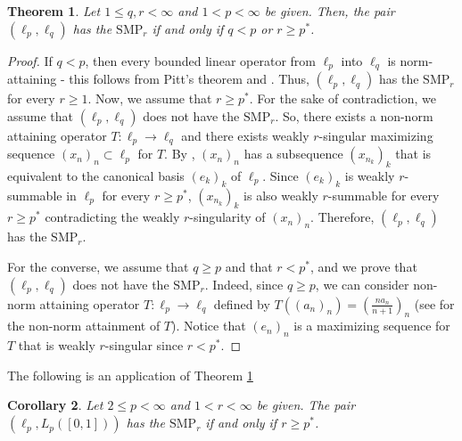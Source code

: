 \documentclass[12 pt]{article}%
\newtheorem{theorem}{Theorem}[section]
\newtheorem{corollary}[theorem]{Corollary}
\newtheorem{final remark}[theorem]{Final Remark}
\begin{document}
\begin{theorem} \label{teoexlp}
    Let $1 \leq q, r < \infty$ and $1 < p < \infty$ be given. Then, the pair $(\ell_p, \ell_q)$ has the $\mathrm{SMP}_r$ if and only if $q< p$ or $r \geq p^*$.
\end{theorem}


\begin{proof}    If $q < p$, then every bounded linear operator from $\ell_p$ into $\ell_q$ is norm-attaining - this follows from Pitt's theorem and \cite[Theorem B]{sheldon}. Thus, $(\ell_p, \ell_q)$ has the $\mathrm{SMP}_r$ for every $r \geq 1$.  
Now, we assume that $r \geq p^*$. For the sake of contradiction, we assume that $(\ell_p, \ell_q)$ does not have the $\mathrm{SMP}_r$. So, there exists a non-norm attaining operator $T: \ell_p \to \ell_q$ and there exists weakly $r$-singular maximizing sequence $(x_n)_n \subset \ell_p$ for $T$. By \cite[Proposition 5]{danieleduardo}, $(x_n)_n$ has a subsequence $(x_{n_k})_k$
that is equivalent to the canonical basis $(e_k)_k$ of $\ell_p$.   Since $(e_k)_k$ is weakly $r$-summable in $\ell_p$ for every $r \geq p^*$, $(x_{n_k})_k$ is also   weakly $r$-summable for every $r \geq p^*$ contradicting the weakly $r$-singularity of $(x_n)_n$. Therefore, $(\ell_p, \ell_q)$ has the $\mathrm{SMP}_r$.
    



For the converse, we assume that $q \geq p$ and that $r < p^*$, and we prove that $(\ell_p, \ell_q)$ does not have the $\mathrm{SMP}_r$. Indeed, since $q \geq p$, we can consider non-norm attaining operator $T: \ell_{p} \to \ell_{q}$ defined by $\displaystyle T((a_{n})_{n})=\left (\frac{n a_{n}}{n+1}\right )_{n}$ (see \cite[p. 419]{danieleduardo} for the non-norm attainment of $T$). Notice that $(e_n)_n$ is a maximizing sequence for $T$ that is weakly $r$-singular since $r < p^*$.    
\end{proof}


The following is an application of Theorem  \ref{teoexlp} 

\begin{corollary} \label{corlp1} Let $2 \leq  p < \infty$ and $1 < r < \infty$ be given. The pair $(\ell_p, L_p([0,1]))$  has the $\mathrm{SMP}_r$ if and only if $r \geq p^*$.
\end{corollary}
\end{document}
